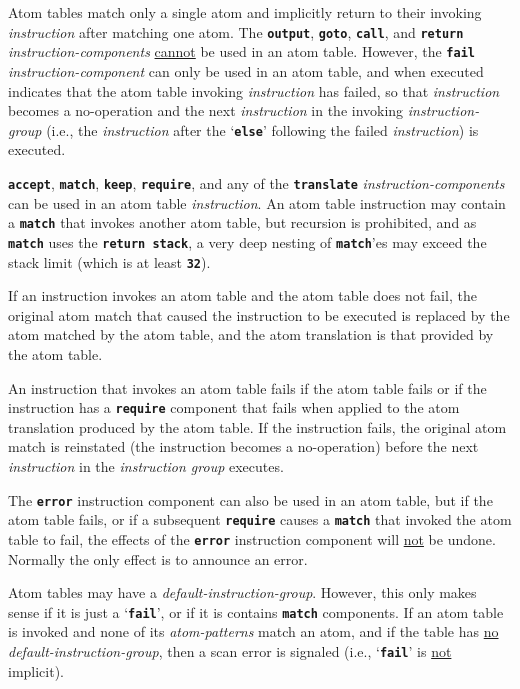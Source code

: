 \documentclass[12pt]{article}
\newcommand{\TT}[1]{{\tt \bfseries #1}}
\begin{document}
Atom tables match only a single atom and implicitly return
to their invoking {\em instruction} after matching one atom.  The
\TT{output}, \TT{goto}, \TT{call}, and \TT{return}
{\em instruction-components} \underline{cannot} be used in an
atom table.  However, the \TT{fail} {\em instruction-component}
can only be used in an atom table, and when executed indicates
that the atom table invoking {\em instruction} has failed, so that
{\em instruction} becomes a no-operation and the next
{\em instruction} in the invoking
{\em instruction-group} (i.e., the {\em instruction}
after the `\TT{else}' following the failed {\em instruction}) is
executed.

\TT{accept}, \TT{match}, \TT{keep}, \TT{require}, and
any of the \TT{translate} {\em instruction-components} can be used in
an atom table {\em instruction}.  An atom table
instruction may contain a \TT{match} that invokes another atom table,
but recursion is prohibited, and as \TT{match} uses the
\TT{return stack}, a very deep nesting of \TT{match}'es may
exceed the stack limit (which is at least \TT{32}).

If an instruction invokes an atom table and
the atom table does not fail,
the original atom match that caused the instruction
to be executed is replaced by the atom matched by the
atom table, and the atom translation is that provided by the atom table.

An instruction that invokes an atom table fails if the atom table
fails or if the instruction has a \TT{require} component that fails
when applied to the atom translation produced by the atom table.
If the instruction fails, the
original atom match is reinstated (the instruction becomes a
no-operation) before the next {\em instruction} in the {\em instruction group}
executes.

The \TT{error} instruction component can also be used in an atom
table, but if the atom table fails, or if a subsequent \TT{require}
causes a \TT{match} that invoked the atom table to fail, the
effects of the \TT{error} instruction component will \underline{not}
be undone.  Normally the only effect is to announce an error.

Atom tables may have a {\em default-instruction-group}.
However, this only makes sense if it is just a `\TT{fail}', or
if it is contains \TT{match} components.  If an atom table
is invoked and none of its {\em atom-patterns} match an atom,
and if the table has \underline{no} {\em default-instruction-group},
then a scan error is signaled (i.e., `\TT{fail}' is \underline{not}
implicit).
\end{document}
